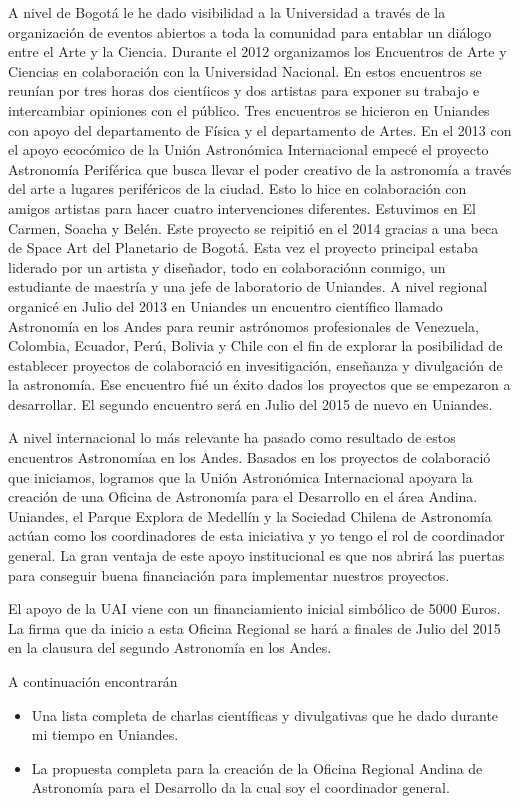 \documentclass[letterpaper,12pt,onecolumn]{article}
\begin{document}
A nivel de Bogot\'a le he dado visibilidad a la Universidad a trav\'es de
la organizaci\'on de eventos abiertos a toda la comunidad para
entablar un di\'alogo entre el Arte y la Ciencia. Durante el 2012
organizamos los Encuentros de Arte y Ciencias en colaboraci\'on con la
Universidad Nacional. En estos encuentros se reun\'ian por tres horas
dos cient\'iicos y dos artistas para exponer su trabajo e intercambiar
opiniones con el p\'ublico. Tres encuentros se hicieron en Uniandes
con apoyo del departamento de F\'isica y el departamento de Artes. 
En el 2013 con el apoyo ecoc\'omico de la Uni\'on Astron\'omica
Internacional empec\'e el proyecto Astronom\'ia Perif\'erica que busca
llevar el poder creativo de la astronom\'ia a trav\'es del arte a lugares
perif\'ericos de la ciudad. Esto lo hice en colaboraci\'on con amigos
artistas para hacer cuatro intervenciones diferentes. Estuvimos en El
Carmen, Soacha y Bel\'en. Este proyecto se reipiti\'o en el 2014 gracias a
una beca de Space Art del Planetario de Bogot\'a. Esta vez el proyecto
principal estaba liderado por un artista y dise\~nador, todo en
colaboraci\'onn conmigo,  un estudiante de maestr\'ia y una jefe de
laboratorio de Uniandes.
A nivel regional organic\'e  en Julio del 2013 en Uniandes un encuentro
cient\'ifico llamado Astronom\'ia en los Andes para reunir astr\'onomos
profesionales de Venezuela, Colombia, Ecuador, Per\'u, Bolivia y Chile
con el fin de explorar la posibilidad de establecer proyectos de
colaboraci\'o  en invesitigaci\'on, ense\~nanza y divulgaci\'on de la
astronom\'ia. Ese encuentro fu\'e un \'exito dados los proyectos que
se empezaron a desarrollar. El segundo encuentro ser\'a en Julio del
2015 de nuevo en Uniandes. 

A nivel internacional lo m\'as relevante ha pasado como resultado de estos
encuentros Astronom\'iaa en los Andes. Basados en los proyectos de
colaboraci\'o  que iniciamos, logramos que la Uni\'on Astron\'omica
Internacional apoyara la creaci\'on de una Oficina de Astronom\'ia
para el Desarrollo en el \'area Andina. Uniandes, el Parque Explora de
Medell\'in y la Sociedad Chilena de Astronom\'ia act\'uan como los
coordinadores de esta iniciativa y yo tengo el rol de coordinador
general. La gran ventaja de este apoyo institucional es que nos
abrir\'a las puertas para conseguir buena financiaci\'on para
implementar nuestros proyectos. 

El apoyo de la UAI viene con un financiamiento inicial simb\'olico de
5000 Euros. La firma que da inicio a esta Oficina Regional se har\'a a
finales de Julio del 2015 en la clausura del segundo Astronom\'ia en los Andes. 

  
A continuaci\'on encontrar\'an 
\begin{itemize}
\item  Una lista completa de charlas cient\'ificas y divulgativas que
  he dado durante mi tiempo en Uniandes. 
\item La propuesta completa para la creaci\'on de la Oficina Regional
  Andina de Astronom\'ia para el Desarrollo da la cual soy el
  coordinador general.
\end{itemize}
\end{document}
